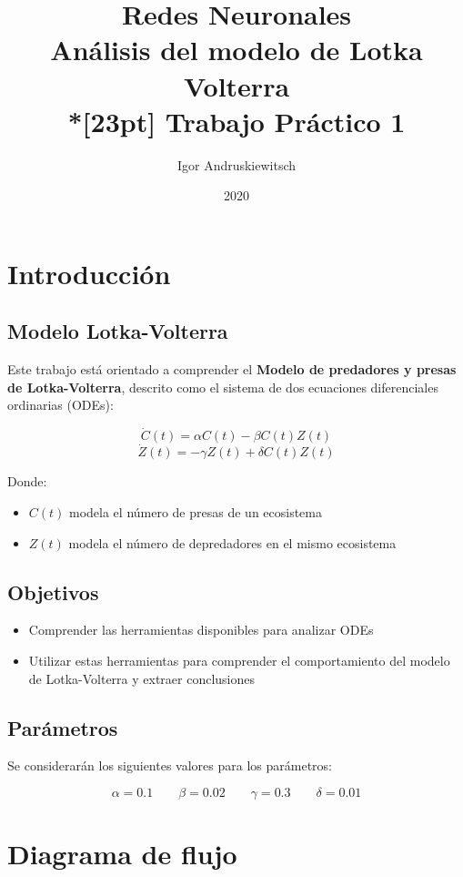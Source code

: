 \documentclass{article}
\title{%
Redes Neuronales \\
Análisis del modelo de Lotka Volterra \\*[23pt]
Trabajo Práctico 1 \\
}
\date{2020}
\author{Igor Andruskiewitsch}
\begin{document}
    \maketitle

\section{Introducción}

\subsection{Modelo Lotka-Volterra}

Este trabajo está orientado a comprender el {\bf Modelo de predadores y presas de Lotka-Volterra}, descrito como el sistema de dos ecuaciones diferenciales ordinarias (ODEs):

\[ \dot{C}(t) = \alpha C(t) - \beta C(t) Z(t) \]
\[ \dot{Z}(t) = - \gamma Z(t) + \delta C(t) Z(t) \]

Donde:

\begin{itemize}
    \item {$ C(t) $ modela el número de presas de un ecosistema}
    \item {$ Z(t) $ modela el número de depredadores en el mismo ecosistema}
\end{itemize}

\subsection{Objetivos}

\begin{itemize}
    \item {Comprender las herramientas disponibles para analizar ODEs}
    \item {Utilizar estas herramientas para comprender el comportamiento del modelo de Lotka-Volterra y extraer conclusiones}
\end{itemize}

\subsection{Parámetros}

Se considerarán los siguientes valores para los parámetros:

\[ \alpha = 0.1 \qquad \beta = 0.02 \qquad \gamma = 0.3 \qquad \delta = 0.01 \]

\section{Diagrama de flujo}
\end{document}

